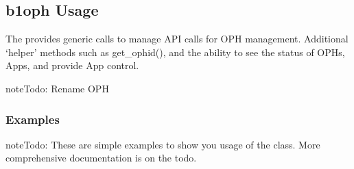 \documentclass[letterpaper,10pt,english]{sphinxmanual}
\begin{document}
\subsection{b1oph Usage}
\label{\detokenize{b1oph-usage:b1oph-usage}}\label{\detokenize{b1oph-usage::doc}}
\sphinxAtStartPar
The  provides generic calls to manage API calls for OPH
management. Additional ‘helper’ methods such as get\_ophid(), and the
ability to see the status of OPHs, Apps, and provide App control.

\begin{sphinxadmonition}{note}{\label{\detokenize{b1oph-usage:id1}}Todo:}
\sphinxAtStartPar
Rename OPH
\end{sphinxadmonition}


\subsubsection{Examples}
\label{\detokenize{b1oph-usage:examples}}
\begin{sphinxadmonition}{note}{\label{\detokenize{b1oph-usage:id2}}Todo:}
\sphinxAtStartPar
These are simple examples to show you usage of the class. More comprehensive
documentation is on the todo.
\end{sphinxadmonition}
\end{document}

